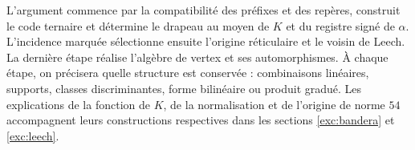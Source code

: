 L'argument commence par la compatibilité des préfixes et des repères,
construit le code ternaire et détermine le drapeau au moyen de \(K\) et du
registre signé de \(\alpha\). L'incidence marquée sélectionne ensuite
l'origine réticulaire et le voisin de Leech. La dernière étape réalise l'algèbre
de vertex et ses automorphismes. À chaque étape, on précisera quelle structure
est conservée : combinaisons linéaires, supports, classes discriminantes, forme
bilinéaire ou produit gradué. Les explications de la fonction de \(K\),
de la normalisation et de l'origine de norme \(54\) accompagnent leurs
constructions respectives dans les sections \ref{exc:bandera} et \ref{exc:leech}.

